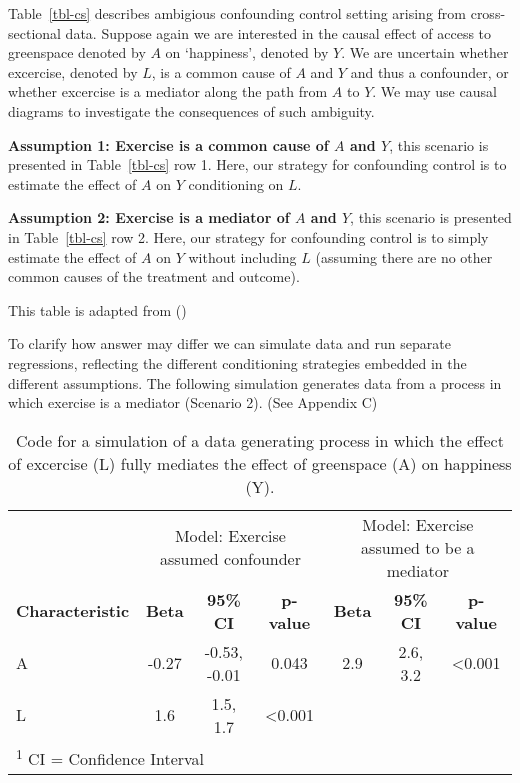 \documentclass[
  singlecolumn]{article}
\begin{document}
Table~\ref{tbl-cs} describes ambigious confounding control setting
arising from cross-sectional data. Suppose again we are interested in
the causal effect of access to greenspace denoted by \(A\) on
`happiness', denoted by \(Y\). We are uncertain whether excercise,
denoted by \(L\), is a common cause of \(A\) and \(Y\) and thus a
confounder, or whether excercise is a mediator along the path from \(A\)
to \(Y\). We may use causal diagrams to investigate the consequences of
such ambiguity.

\textbf{Assumption 1: Exercise is a common cause of \(A\) and \(Y\)},
this scenario is presented in Table~\ref{tbl-cs} row 1. Here, our
strategy for confounding control is to estimate the effect of \(A\) on
\(Y\) conditioning on \(L\).

\textbf{Assumption 2: Exercise is a mediator of \(A\) and \(Y\)}, this
scenario is presented in Table~\ref{tbl-cs} row 2. Here, our strategy
for confounding control is to simply estimate the effect of \(A\) on
\(Y\) without including \(L\) (assuming there are no other common causes
of the treatment and outcome).

\begin{table}

\caption{\label{tbl-cs}This table is adapted from
()}

\centering{

\examplecrosssection

}

\end{table}%

To clarify how answer may differ we can simulate data and run separate
regressions, reflecting the different conditioning strategies embedded
in the different assumptions. The following simulation generates data
from a process in which exercise is a mediator (Scenario 2). (See
Appendix C)

\begin{table}
\caption{Code for a simulation of a data generating process in which the effect
of excercise (L) fully mediates the effect of greenspace (A) on
happiness (Y).}\tabularnewline

\centering
\begin{tabular}{lcccccc}
\toprule
\multicolumn{1}{c}{ } & \multicolumn{3}{c}{Model: Exercise assumed confounder} & \multicolumn{3}{c}{Model: Exercise assumed to be a mediator} \\
\cmidrule(l{3pt}r{3pt}){2-4} \cmidrule(l{3pt}r{3pt}){5-7}
\textbf{Characteristic} & \textbf{Beta} & \textbf{95\% CI} & \textbf{p-value} & \textbf{Beta} & \textbf{95\% CI} & \textbf{p-value}\\
\midrule
A & -0.27 & -0.53, -0.01 & 0.043 & 2.9 & 2.6, 3.2 & <0.001\\
L & 1.6 & 1.5, 1.7 & <0.001 &  &  & \\
\bottomrule
\multicolumn{7}{l}{\rule{0pt}{1em}\textsuperscript{1} CI = Confidence Interval}\\
\end{tabular}
\end{table}
\end{document}
